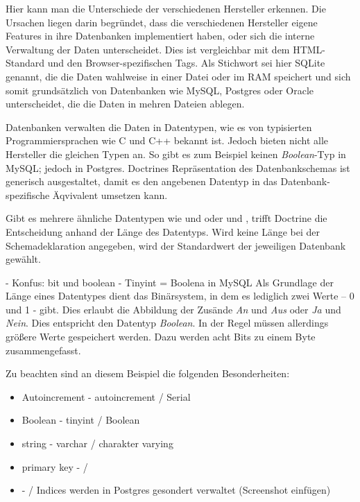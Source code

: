 Hier kann man die Unterschiede der verschiedenen Hersteller erkennen. Die Ursachen liegen darin begründet, dass die verschiedenen Hersteller eigene Features in ihre Datenbanken implementiert haben, oder sich die interne Verwaltung der Daten unterscheidet. Dies ist vergleichbar mit dem HTML-Standard und den Browser-spezifischen Tags. Als Stichwort sei hier SQLite genannt, die die Daten wahlweise in einer Datei oder im RAM speichert und sich somit grundsätzlich von Datenbanken wie MySQL, Postgres oder Oracle unterscheidet, die die Daten in mehren Dateien ablegen.

Datenbanken verwalten die Daten in Datentypen, wie es von typisierten Programmiersprachen wie C und C++ bekannt ist. Jedoch bieten nicht alle Hersteller die gleichen Typen an. So gibt es zum Beispiel keinen \textit{Boolean}-Typ in MySQL; jedoch in Postgres. Doctrines Repräsentation des Datenbankschemas ist generisch ausgestaltet, damit es den angebenen Datentyp in das Datenbank-spezifische Äqvivalent umsetzen kann.


Gibt es mehrere ähnliche Datentypen wie  und  oder  und , trifft Doctrine die Entscheidung anhand der Länge des Datentyps. Wird keine Länge bei der Schemadeklaration angegeben, wird der Standardwert der jeweiligen Datenbank gewählt.

- Konfus: bit und boolean
- Tinyint = Boolena in MySQL
Als Grundlage der Länge eines Datentypes dient das Binärsystem, in dem es lediglich zwei Werte – 0 und 1 - gibt. Dies erlaubt die Abbildung der Zusände \textit{An} und \textit{Aus} oder \textit{Ja} und \textit{Nein}. Dies entspricht den Datentyp \textit{Boolean}. In der Regel müssen allerdings größere Werte gespeichert werden. Dazu werden acht Bits zu einem Byte zusammengefasst.



Zu beachten sind an diesem Beispiel die folgenden Besonderheiten:
\begin{itemize}
	\item Autoincrement - autoincrement / Serial
	\item Boolean - tinyint / Boolean
	\item string - varchar / charakter varying
	\item primary key -  / 
	\item {} -  / Indices werden in Postgres gesondert verwaltet (Screenshot einfügen)
\end{itemize}
